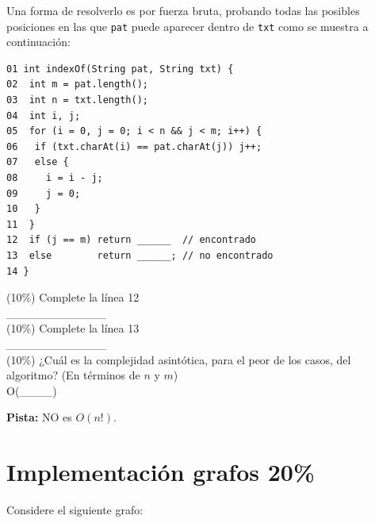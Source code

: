 \documentclass[twocolumn]{article}
\begin{document}
Una forma de resolverlo es por fuerza bruta, probando todas las posibles posiciones
en las que \texttt{pat} puede aparecer dentro de \texttt{txt} como se muestra a continuación:

{\small
\begin{verbatim}
01 int indexOf(String pat, String txt) {
02  int m = pat.length();
03  int n = txt.length();
04  int i, j;
05  for (i = 0, j = 0; i < n && j < m; i++) {
06   if (txt.charAt(i) == pat.charAt(j)) j++;
07   else {
08     i = i - j;
09     j = 0;
10   }
11  }
12  if (j == m) return ______  // encontrado
13  else        return ______; // no encontrado
14 }
\end{verbatim}
}





     (10\%) Complete la línea 12\\


  \_\_\_\_\_\_\_\_\_\_\_\_ \\

       (10\%) Complete la línea 13\\


  \_\_\_\_\_\_\_\_\_\_\_\_ \\

     (10\%) ¿Cuál es la complejidad asintótica, para el peor de los casos, del algoritmo? (En términos de $n$ y $m$)\\


  O(\_\_\_\_)


\textbf{Pista:} NO es $O(n!)$.

\section{Implementación grafos 20\%}
Considere el siguiente grafo:
\end{document}

